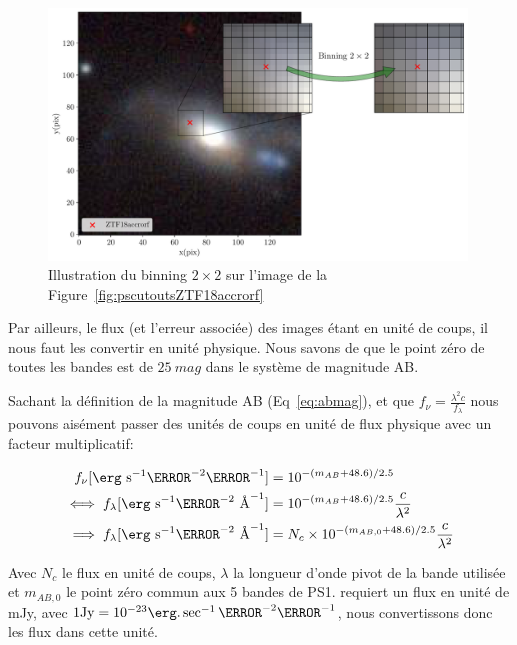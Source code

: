 \documentclass[../main/main.tex]{subfiles}
\begin{document}
\begin{figure}
  \centering
  \includegraphics[width=0.99\textwidth]{../figures/05_sedfit/ps_cutouts_ZTF18accrorf_binned.pdf}
  \caption[Illustration binning $2\times2$ sur les images
  PS1.]{Illustration du binning $2\times2$ sur l'image de la Figure~\ref{fig:pscutoutsZTF18accrorf}}
  \label{fig:pscutoutsZTF18accrorf_binned}
\end{figure}

Par ailleurs, le flux (et l'erreur associée) des images étant en unité
de coups, il nous faut les convertir en unité physique. Nous savons de
\citet{Tonry2012} que le point zéro de
toutes les bandes est de $\SI{25}{mag}$ dans le système de magnitude AB.

Sachant la définition de la magnitude AB (Eq~\ref{eq:abmag}), et que
$f_{\nu}=\frac{\lambda^{2}{c}}{f_{\lambda}}$ nous pouvons aisément passer des
unités de coups en unité de flux physique avec un facteur multiplicatif:

\begin{align*}
   f_{\nu}[\erg\ \text{s}^{-1}\cm^{-2}\Hz^{-1}]&=
                                                     10^{-(m_{AB}+48.6)/2.5}\\
  \iff f_{\lambda}[\erg\ \text{s}^{-1}\cm^{-2}\ \text{\AA}^{-1}]&=
                                                                  10^{-(m_{AB}+48.6)/2.5}\frac{c}{\lambda^{2}}\\
  \implies f_{\lambda}[\erg\ \text{s}^{-1}\cm^{-2}\
  \text{\AA}^{-1}]&=N_{c}\times 10^{-(m_{AB,0}+48.6)/2.5}\frac{c}{\lambda^{2}}
\end{align*}

Avec $N_{c}$ le flux en unité de coups, $\lambda$ la longueur d'onde
pivot de la bande utilisée et $m_{AB,0}$ le point zéro commun aux 5
bandes de PS1. \pkg{CIGALE} requiert un flux en unité de mJy, avec
$1\text{Jy} = 10^{-23}\erg.\sec^{-1}\cm^{-2}\Hz^{-1}$, nous
convertissons donc les flux dans cette unité.
\end{document}
